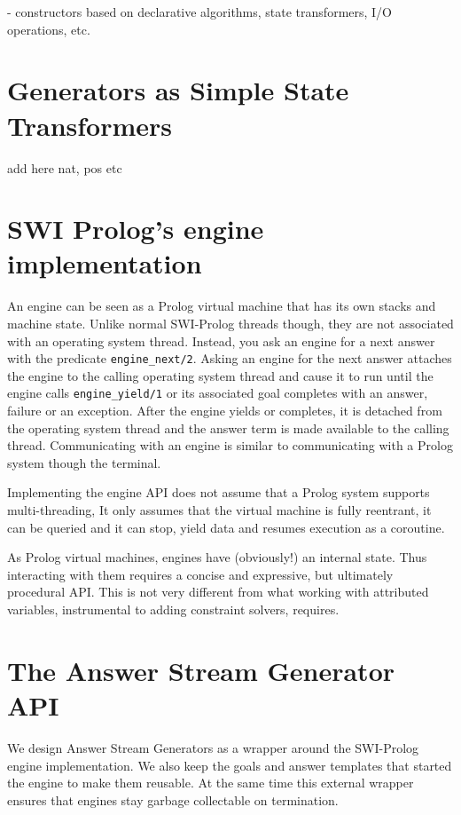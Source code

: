 \documentclass{new_tlp}
\begin{document}
{\Large - constructors based on declarative algorithms, state transformers, I/O operations, etc.}

\section{Generators as Simple State Transformers}

{\Large add here nat, pos etc}


\section{SWI Prolog's engine implementation}

An engine can be seen as a Prolog virtual machine that has its own stacks and machine state. Unlike normal SWI-Prolog threads \cite{swi,swi_threads} though, they are not associated with an operating system thread. Instead, you ask an engine for a next answer with the predicate {\tt engine\_next/2}. Asking an engine for the next answer attaches the engine to the calling operating system thread and cause it to run until the engine calls {\tt engine\_yield/1} or its associated goal completes with an answer, failure or an exception. After the engine yields or completes, it is detached from the operating system thread and the answer term is made available to the calling thread. Communicating with an engine is similar to communicating with a Prolog system though the terminal.

Implementing the engine API does not assume that a Prolog system supports multi-threading, It only assumes that the virtual machine is fully reentrant, it can be queried and it can stop, yield data and resumes execution as a coroutine.

As Prolog virtual machines, engines have (obviously!) an internal state. Thus interacting with them requires a concise and expressive, but ultimately procedural API. This is not very different from what working with attributed variables, instrumental to adding constraint solvers, requires.

\section{The Answer Stream Generator API}

We design Answer Stream Generators as a wrapper around the SWI-Prolog engine implementation.
We also keep the goals and answer templates that started the engine to make them reusable. At the same time this external wrapper ensures that engines stay garbage collectable on termination.
\end{document}
